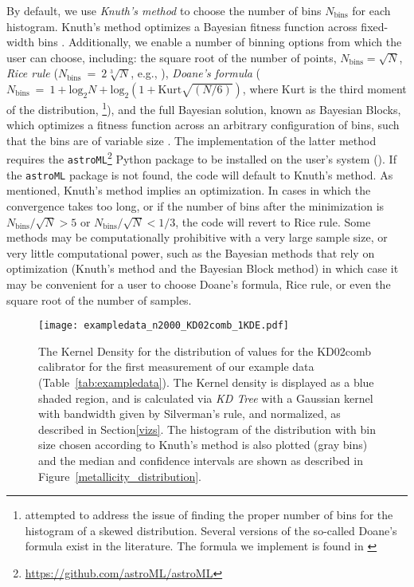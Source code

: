 \documentclass{emulateapj} \usepackage{amsmath} \usepackage{float}
\begin{document}
By default, we use
\emph{Knuth's method} to choose the number of bins $N_\mathrm{bins}$
for each histogram. Knuth's method optimizes a Bayesian fitness
function across fixed-width bins \citep{knuth06}. Additionally, we
enable a number of binning options from which the user can choose,
including: the square root of the number of points,
$N_\mathrm{bins}=\sqrt{N}$, \emph{Rice rule}
($N_\mathrm{bins}~=~2\sqrt[3]{N}$, e.g., \citealt{hastie09}),
\emph{Doane's formula} ($N_\mathrm{bins}~=~1 + \mathrm{log}_2{N} +
\mathrm{log}_2\left(1 + \mathrm{Kurt}\sqrt{(N / 6)}\right)$, where
Kurt is the third moment of the distribution,
\citealt{doane76}\footnote{\citet{doane76} attempted to address the
  issue of finding the proper number of bins for the histogram of a
  skewed distribution. Several versions of the so-called Doane's
  formula exist in the literature. The formula we implement is found in
  \citealt{bonate11}}), and the full Bayesian solution, known as
Bayesian Blocks, which optimizes a fitness function across an
arbitrary configuration of bins, such that the bins are of variable
size \citep{scargle13}. The implementation of the latter method
requires the
\verb=astroML=\footnote{\url{https://github.com/astroML/astroML}}
Python package to be installed on the user's system
(\citealt{astroml}). If the \verb=astroML= package is not found, the
code will default to Knuth's method.  As mentioned, Knuth's method
implies an optimization. In cases in which the convergence takes too
long, or if the number of bins after the minimization is
$N_\mathrm{bins}/\sqrt{N} > 5$ or $N_\mathrm{bins}/\sqrt{N} < 1/3$,
the code will revert to Rice rule.  Some methods may be
computationally prohibitive with a very large sample size, or very
little computational power, such as the Bayesian methods that rely on
optimization (Knuth's method and the Bayesian Block method) in which
case it may be convenient for a user to choose Doane's formula, Rice
rule, or even the square root of the number of samples.
\begin{figure}[ht!]
  \texttt{[image: exampledata\_n2000\_KD02comb\_1KDE.pdf]}
   \caption{The Kernel Density for the distribution of values for the
     KD02comb calibrator for the first measurement of our example data
     (Table~\ref{tab:exampledata}). The Kernel density is displayed as
     a blue shaded region, and is calculated via \emph{KD Tree} with a
     Gaussian kernel with bandwidth given by Silverman's rule, and
     normalized, as described in Section\ref{vizs}. The histogram of
     the distribution with bin size chosen according to Knuth's method
     is also plotted (gray bins) and the median and confidence
     intervals are shown as described in
     Figure~\ref{metallicity_distribution}.}\label{fig:KDE}

\end{figure}
\end{document}
